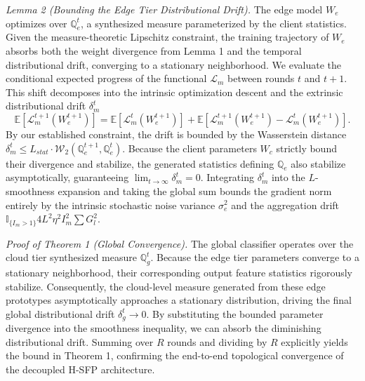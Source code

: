 \noindent\textit{Lemma 2 (Bounding the Edge Tier Distributional Drift).} The edge model $W_e$ optimizes over $\mathbb{Q}_e^t$, a synthesized measure parameterized by the client statistics. Given the measure-theoretic Lipschitz constraint, the training trajectory of $W_e$ absorbs both the weight divergence from Lemma 1 and the temporal distributional drift, converging to a stationary neighborhood. We evaluate the conditional expected progress of the functional $\mathcal{L}_m$ between rounds $t$ and $t+1$. This shift decomposes into the intrinsic optimization descent and the extrinsic distributional drift $\delta_m^t$
\begin{equation}
\mathbb{E}[\mathcal{L}_m^{t+1}(W_e^{t+1})] = \mathbb{E}[\mathcal{L}_m^t(W_e^{t+1})] + \mathbb{E}[\mathcal{L}_m^{t+1}(W_e^{t+1}) - \mathcal{L}_m^t(W_e^{t+1})].
\end{equation}
By our established constraint, the drift is bounded by the Wasserstein distance $\delta_m^t \le L_{stat} \cdot \mathcal{W}_2(\mathbb{Q}_e^{t+1}, \mathbb{Q}_e^t)$. Because the client parameters $W_c$ strictly bound their divergence and stabilize, the generated statistics defining $\mathbb{Q}_e$ also stabilize asymptotically, guaranteeing $\lim_{t \to \infty} \delta_m^t = 0$. Integrating $\delta_m^t$ into the $L$-smoothness expansion and taking the global sum bounds the gradient norm entirely by the intrinsic stochastic noise variance $\sigma_e^2$ and the aggregation drift $\mathbb{I}_{\{I_m>1\}} 4L^2\eta^2 I_m^2 \sum G_l^2$.

\noindent\textit{Proof of Theorem 1 (Global Convergence).} The global classifier operates over the cloud tier synthesized measure $\mathbb{Q}_g^t$. Because the edge tier parameters converge to a stationary neighborhood, their corresponding output feature statistics rigorously stabilize. Consequently, the cloud-level measure generated from these edge prototypes asymptotically approaches a stationary distribution, driving the final global distributional drift $\delta_g^t \to 0$. By substituting the bounded parameter divergence into the smoothness inequality, we can absorb the diminishing distributional drift. Summing over $R$ rounds and dividing by $R$ explicitly yields the bound in Theorem 1, confirming the end-to-end topological convergence of the decoupled H-SFP architecture.